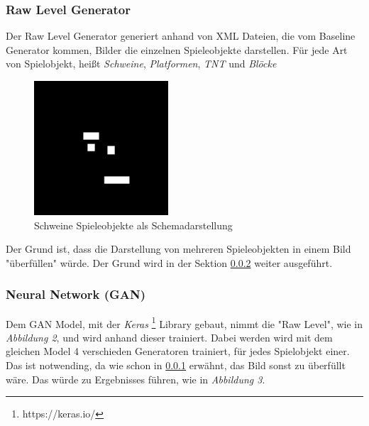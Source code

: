 \subsubsection{Raw Level Generator}
\label{section:raw}

Der Raw Level Generator generiert anhand von XML Dateien, die vom Baseline Generator kommen, Bilder die einzelnen Spieleobjekte darstellen. Für jede Art von Spielobjekt, heißt \textit{Schweine}, \textit{Platformen}, \textit{TNT} und \textit{Blöcke}

\begin{figure}
	\centering
	\includegraphics[height=5cm, width=5cm]{img/raw_level.png}
	\caption{Schweine Spieleobjekte als Schemadarstellung}
\end{figure}

Der Grund ist, dass die Darstellung von mehreren Spieleobjekten in einem Bild "überfüllen" würde. Der Grund wird in der Sektion \ref{section:gan} weiter ausgeführt.

\subsubsection{Neural Network (GAN)}
\label{section:gan}
Dem GAN Model, mit der \textit{Keras} \footnote{https://keras.io/} Library gebaut, nimmt die "Raw Level", wie in \textit{Abbildung 2}, und wird anhand dieser trainiert. Dabei werden wird mit dem gleichen Model 4 verschieden Generatoren trainiert, für jedes Spielobjekt einer. Das ist notwending, da wie schon in \ref{section:raw} erwähnt, das Bild sonst zu überfüllt wäre. Das würde zu Ergebnisses führen, wie in \textit{Abbildung 3}.

